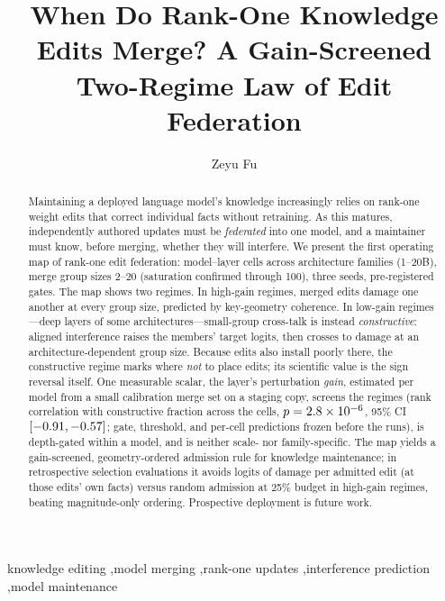 \documentclass[preprint,12pt]{elsarticle}
\begin{document}
\begin{frontmatter}

\title{When Do Rank-One Knowledge Edits Merge? A Gain-Screened Two-Regime Law of Edit Federation}

\author[1]{Zeyu Fu}

\begin{abstract}
Maintaining a deployed language model's knowledge increasingly relies on rank-one
weight edits that correct individual facts without retraining. As this matures,
independently authored updates must be \emph{federated} into one model, and a
maintainer must know, before merging, whether they will interfere. We present the
first operating map of rank-one edit federation: \nCells{} model--layer cells across
\nFamilies{} architecture families (1--20B), merge group sizes 2--20 (saturation
confirmed through 100), three seeds, pre-registered gates. The map shows two regimes.
In high-gain regimes, merged edits damage one another at every group size, predicted
by key-geometry coherence. In low-gain regimes---deep layers of some
architectures---small-group cross-talk is instead \emph{constructive}: aligned
interference raises the members' target logits, then crosses to damage at an
architecture-dependent group size. Because edits also install poorly there, the
constructive regime marks where \emph{not} to place edits; its scientific value is the
sign reversal itself. One measurable scalar, the layer's perturbation \emph{gain},
estimated per model from a small calibration merge set on a staging copy, screens the
regimes (rank correlation \ordSpearman{} with constructive fraction across the
\nCells{} cells, $p=2.8\times10^{-6}{}$, 95\% CI $[-0.91,-0.57]{}$; gate, threshold, and
per-cell predictions frozen before the runs), is depth-gated within a model, and is
neither scale- nor family-specific. The map yields a gain-screened, geometry-ordered
admission rule for knowledge maintenance; in retrospective selection evaluations it
avoids \benefitHighQtwofive{} logits of damage per admitted edit (at those edits' own
facts) versus random admission at 25\% budget in high-gain regimes, beating
magnitude-only ordering. Prospective deployment is future work.
\end{abstract}

\begin{keyword}
knowledge editing \sep model merging \sep rank-one updates \sep interference
prediction \sep model maintenance
\end{keyword}
\end{frontmatter}
\end{document}
